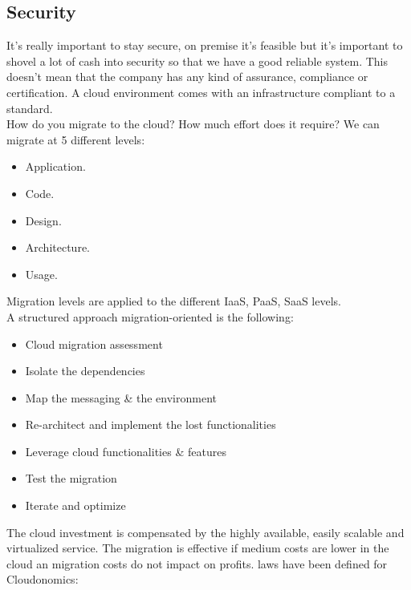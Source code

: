 \subsection{Security}
It's really important to stay secure, on premise it's feasible but it's important to shovel a lot of cash into security so that we have a good reliable system. This doesn't mean that the company has any kind of assurance, compliance or certification. \n
A cloud environment comes with an infrastructure compliant to a standard. \\
\miniSpace
How do you migrate to the cloud? How much effort does it require? \n
We can migrate at 5 different levels:
\begin{itemize}
    \item Application.
    \item Code.
    \item Design.
    \item Architecture.
    \item Usage.
\end{itemize}
Migration levels are applied to the different IaaS, PaaS, SaaS levels. \\
A structured approach migration-oriented is the following:
\begin{itemize}
    \item Cloud migration assessment
    \item Isolate the dependencies
    \item Map the messaging \& the environment
    \item Re-architect and implement the lost functionalities
    \item Leverage cloud functionalities \& features
    \item Test the migration
    \item Iterate and optimize
\end{itemize}
The cloud investment is compensated by the highly available, easily scalable and virtualized service. \n
The migration is effective if medium costs are lower in the cloud an migration costs do not impact on profits.  laws have been defined for Cloudonomics:
